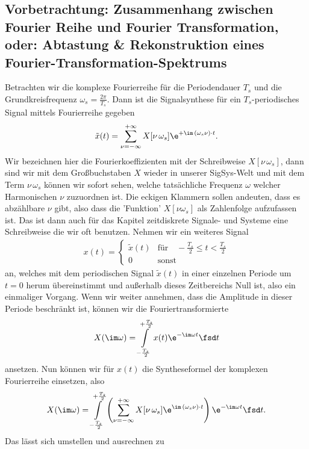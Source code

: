\subsection*{Vorbetrachtung: Zusammenhang zwischen Fourier Reihe und Fourier
Transformation,
oder:
Abtastung \& Rekonstruktion eines Fourier-Transformation-Spektrums}
%
Betrachten wir die komplexe Fourierreihe für die Periodendauer
$T_s$ und die Grundkreisfrequenz $\omega_s=\frac{2\pi}{T_s}$.
Dann ist die Signalsynthese für ein $T_s$-periodisches Signal mittels Fourierreihe
gegeben
\begin{align}
  \tilde{x}(t) = \sum_{\nu=-\infty}^{+\infty} X[\nu\,\omega_s]
  \e^{+\im\,(\omega_s \nu)\cdot t}.
\end{align}
Wir bezeichnen hier die Fourierkoeffizienten mit der Schreibweise
$X[\nu\,\omega_s]$,
dann sind wir mit dem Großbuchstaben $X$ wieder in unserer SigSys-Welt und mit
dem Term $\nu\,\omega_s$ können wir sofort sehen,
welche tatsächliche Frequenz $\omega$ welcher Harmonischen $\nu$ zuzuordnen ist.
Die eckigen Klammern sollen andeuten, dass
es abzählbare $\nu$ gibt, also dass die 'Funktion' $X[\nu\omega_s]$
als Zahlenfolge aufzufassen ist. Das ist dann auch für das Kapitel zeitdiskrete
Signale- und Systeme eine Schreibweise die wir oft benutzen.
%
Nehmen wir ein weiteres Signal
\begin{align}
  x(t) =
  \begin{cases}
  \tilde{x}(t)&\text{für}\quad-\frac{T_s}{2} \leq t < \frac{T_s}{2}\\
  0&\text{sonst}
  \end{cases}
\end{align}
an, welches mit dem periodischen Signal $\tilde{x}(t)$
in einer einzelnen Periode um $t=0$ herum übereinstimmt
und außerhalb dieses Zeitbereichs Null ist, also ein einmaliger Vorgang.
Wenn wir weiter annehmen, dass die Amplitude in dieser Periode beschränkt ist,
können wir die Fouriertransformierte
\begin{align}
  X(\im\omega) = \int\limits_{-\frac{T_s}{2}}^{+\frac{T_s}{2}} x(t) \e^{-\im\omega t} \fsd t
\end{align}
ansetzen.
Nun können wir für $x(t)$ die Syntheseformel der komplexen Fourierreihe einsetzen,
also
\begin{align}
X(\im\omega) = \int\limits_{-\frac{T_s}{2}}^{+\frac{T_s}{2}}
\left(\sum_{\nu=-\infty}^{+\infty} X[\nu\,\omega_s] \e^{\im\,(\omega_s \nu)\cdot t}\right)
\e^{-\im\omega t} \fsd t.
\end{align}
Das lässt sich umstellen und ausrechnen zu
